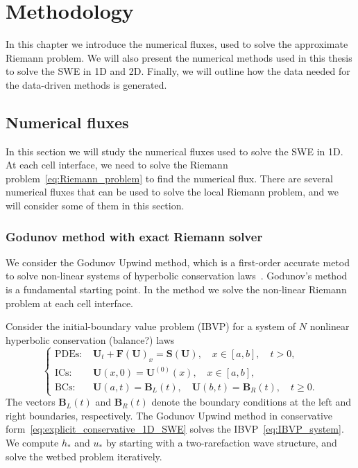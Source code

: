 \chapter{Methodology}
In this chapter we introduce the numerical fluxes, used to solve the approximate Riemann problem.
We will also present the numerical methods used in this thesis to solve the SWE in 1D and 2D.
Finally, we will outline how the data needed for the data-driven methods is generated.

\section{Numerical fluxes}
In this section we will study the numerical fluxes used to solve the SWE in 1D.
At each cell interface, we need to solve the Riemann problem~\eqref{eq:Riemann_problem} to find the numerical flux.
There are several numerical fluxes that can be used to solve the local Riemann problem, and we will consider some of them in this section.


\subsection{Godunov method with exact Riemann solver}
We consider the Godunov Upwind method, which is a first-order accurate metod to solve non-linear systems of hyperbolic conservation laws~\cite{Toro2024}.
Godunov's method is a fundamental starting point.
In the method we solve the non-linear Riemann problem at each cell interface. 

Consider the initial-boundary value problem (IBVP) for a system of $N$ nonlinear hyperbolic conservation (balance?) laws     
\begin{equation}\label{eq:IBVP_system}
    \begin{cases}
    \text{PDEs: }    &\mathbf{U}_t + \mathbf{F(U)}_x = \mathbf{S(U)}, \quad x \in [a, b], \quad t > 0, \\
    \text{ICs: }    &\mathbf{U}(x,0) = \mathbf{U}^{(0)}(x), \quad x \in [a,b], \\
    \text{BCs: }    &\mathbf{U}(a,t) = \mathbf{B}_{L}(t), \quad \mathbf{U}(b,t) = \mathbf{B}_{R}(t), \quad t \geq 0.
    \end{cases}
\end{equation}
The vectors $\mathbf{B}_L (t)$ and $\mathbf{B}_R (t)$ denote the boundary conditions at the left and right boundaries, respectively.
The Godunov Upwind method in conservative form~\eqref{eq:explicit_conservative_1D_SWE} solves the IBVP~\eqref{eq:IBVP_system}.
We compute $h_*$ and $u_*$ by starting with a two-rarefaction wave structure, and solve the wetbed problem iteratively.


